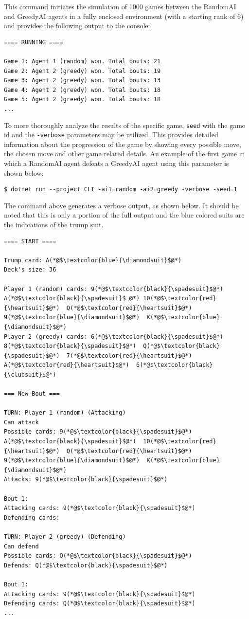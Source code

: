 This command initiates the simulation of 1000 games between the RandomAI and GreedyAI agents in a fully enclosed environment (with a starting rank of 6) and provides the following output to the console:

\begin{lstlisting}
==== RUNNING ====

Game 1: Agent 1 (random) won. Total bouts: 21
Game 2: Agent 2 (greedy) won. Total bouts: 19
Game 3: Agent 2 (greedy) won. Total bouts: 13
Game 4: Agent 2 (greedy) won. Total bouts: 18
Game 5: Agent 2 (greedy) won. Total bouts: 18
...
\end{lstlisting}

To more thoroughly analyze the results of the specific game, \texttt{seed} with the game id and the \texttt{-verbose}  parameters may be utilized. This provides detailed information about the progression of the game by showing every possible move, the chosen move and other game related details. An example of the first game in which a RandomAI agent defeats a GreedyAI agent using this parameter is shown below:


\begin{lstlisting}
$ dotnet run --project CLI -ai1=random -ai2=greedy -verbose -seed=1
\end{lstlisting}

The command above generates a verbose output, as shown below. It should be noted that this is only a portion of the full output and the blue colored suits are the indications of the trump suit.

\begin{lstlisting}
==== START ====

Trump card: A(*@$\textcolor{blue}{\diamondsuit}$@*)
Deck's size: 36

Player 1 (random) cards: 9(*@$\textcolor{black}{\spadesuit}$@*)  A(*@$\textcolor{black}{\spadesuit}$ @*) 10(*@$\textcolor{red}{\heartsuit}$@*)  Q(*@$\textcolor{red}{\heartsuit}$@*)  9(*@$\textcolor{blue}{\diamondsuit}$@*)  K(*@$\textcolor{blue}{\diamondsuit}$@*)
Player 2 (greedy) cards: 6(*@$\textcolor{black}{\spadesuit}$@*)  8(*@$\textcolor{black}{\spadesuit}$@*)  Q(*@$\textcolor{black}{\spadesuit}$@*)  7(*@$\textcolor{red}{\heartsuit}$@*)  A(*@$\textcolor{red}{\heartsuit}$@*)  6(*@$\textcolor{black}{\clubsuit}$@*)

=== New Bout ===

TURN: Player 1 (random) (Attacking)
Can attack
Possible cards: 9(*@$\textcolor{black}{\spadesuit}$@*)  A(*@$\textcolor{black}{\spadesuit}$@*)  10(*@$\textcolor{red}{\heartsuit}$@*)  Q(*@$\textcolor{red}{\heartsuit}$@*)  9(*@$\textcolor{blue}{\diamondsuit}$@*)  K(*@$\textcolor{blue}{\diamondsuit}$@*)
Attacks: 9(*@$\textcolor{black}{\spadesuit}$@*)

Bout 1:
Attacking cards: 9(*@$\textcolor{black}{\spadesuit}$@*)
Defending cards:

TURN: Player 2 (greedy) (Defending)
Can defend
Possible cards: Q(*@$\textcolor{black}{\spadesuit}$@*)
Defends: Q(*@$\textcolor{black}{\spadesuit}$@*)

Bout 1:
Attacking cards: 9(*@$\textcolor{black}{\spadesuit}$@*)
Defending cards: Q(*@$\textcolor{black}{\spadesuit}$@*)
...
\end{lstlisting}

